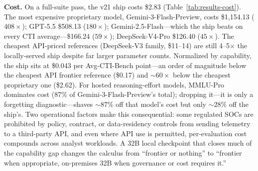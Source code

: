 \documentclass[conference]{IEEEtran}
\begin{document}
\textbf{Cost.} On a full-suite pass, the v21 ship costs \$2.83 (Table~\ref{tab:results-cost}). The most expensive proprietary model, Gemini-3-Flash-Preview, costs \$1{,}154.13 ($408\times$); GPT-5.5 \$508.13 ($180\times$); Gemini-2.5-Flash---which the ship beats on every CTI average---\$166.24 ($59\times$); DeepSeek-V4-Pro \$126.40 ($45\times$). The cheapest API-priced references (DeepSeek-V3 family, \$11--14) are still 4--5$\times$ the locally-served ship despite far larger parameter counts. Normalized by capability, the ship sits at \$0.043 per Avg-CTI-Bench point---an order of magnitude below the cheapest API frontier reference (\$0.17) and ${\sim}60\times$ below the cheapest proprietary one (\$2.62). For hosted reasoning-effort models, MMLU-Pro dominates cost (87\% of Gemini-3-Flash-Preview's total); dropping it---it is only a forgetting diagnostic---shaves ${\sim}87\%$ off that model's cost but only ${\sim}28\%$ off the ship's. Two operational factors make this consequential: some regulated SOCs are prohibited by policy, contract, or data-residency controls from sending telemetry to a third-party API, and even where API use is permitted, per-evaluation cost compounds across analyst workloads. A 32B local checkpoint that closes much of the capability gap changes the calculus from ``frontier or nothing'' to ``frontier when appropriate, on-premises 32B when governance or cost requires it.''
\end{document}
